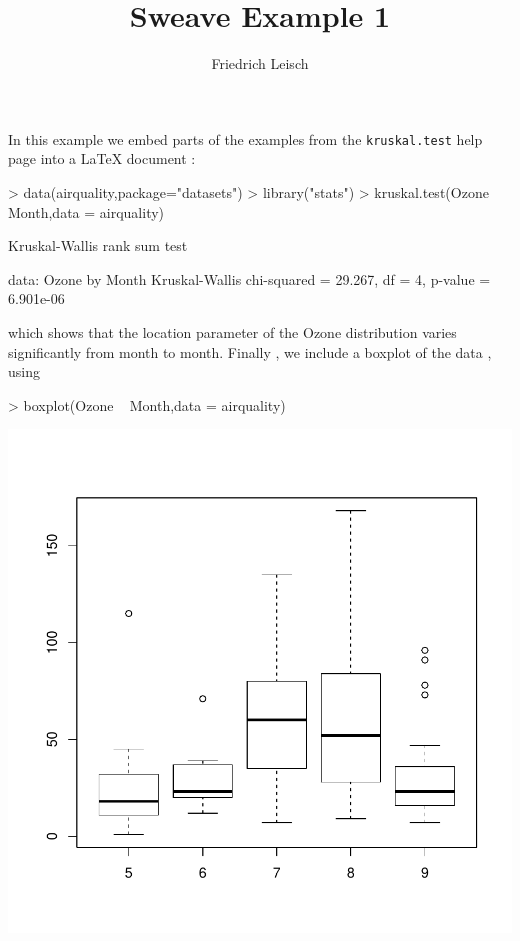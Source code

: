 \documentclass[a4paper]{article}
\title{Sweave Example 1}
\author{Friedrich Leisch}
\begin{document}
{}

\mydate
\maketitle 

In this example we embed parts of the examples from the
\texttt {kruskal.test} help page into a \LaTeX{} document :


\begin{Schunk}
\begin{Sinput}
> data(airquality,package="datasets")
> library("stats")
> kruskal.test(Ozone ~ Month,data = airquality)
\end{Sinput}
\begin{Soutput}
	Kruskal-Wallis rank sum test

data:  Ozone by Month
Kruskal-Wallis chi-squared = 29.267, df = 4, p-value = 6.901e-06
\end{Soutput}
\end{Schunk}

which shows that the location parameter of the Ozone
distribution varies significantly from month to month. Finally , we
include a boxplot of the data , using

\begin{Schunk}
\begin{Sinput}
>   boxplot(Ozone ~ Month,data = airquality)
\end{Sinput}
\end{Schunk}
  
\begin{center}
\includegraphics{example-1-003}
\end{center}
\end{document}
